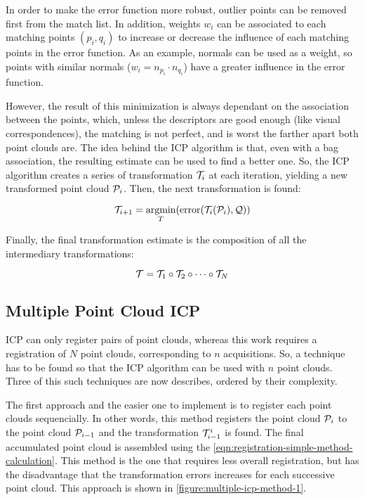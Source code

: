 In order to make the error function more robust, outlier points can be removed first from the match list. In addition, weights $w_i$ can be associated to each matching points $(p_i, q_i)$ to increase or decrease the influence of each matching points in the error function. As an example, normals can be used as a weight, so points with similar normals ($w_i = n_{p_i} \cdot n_{q_i}$) have a greater influence in the error function. 

However, the result of this minimization is always dependant on the association between the points, which, unless the descriptors are good enough (like visual correspondences), the matching is not perfect, and is worst the farther apart both point clouds are. The idea behind the ICP algorithm is that, even with a bag association, the resulting estimate can be used to find a better one. So, the ICP algorithm creates a series of transformation $\mathcal{T}_i$ at each iteration, yielding a new transformed point cloud $\mathcal{P}_i$. Then, the next transformation is found:

\begin{equation}
    \mathcal{T}_{i+1} = \underset{T}{\textrm{argmin}}(\textrm{error}(\mathcal{T}_i(\mathcal{P}_i), \mathcal{Q}))
\end{equation}

Finally, the final transformation estimate is the composition of all the intermediary transformations:

\begin{equation}
    \mathcal{T} = \mathcal{T}_1 \circ \mathcal{T}_2 \circ \dots \circ \mathcal{T}_N
\end{equation}

\subsection{Multiple Point Cloud ICP}
\label{section:multiple-pointcloud-icp}

ICP can only register pairs of point clouds, whereas this work requires a registration of $N$ point clouds, corresponding to $n$ acquisitions. So, a technique has to be found so that the ICP algorithm can be used with $n$ point clouds. Three of this such techniques are now describes, ordered by their complexity.

The first approach and the easier one to implement is to register each point clouds sequencially. In other words, this method registers the point cloud $\mathcal{P}_i$ to the point cloud $\mathcal{P}_{i-1}$ and the transformation $\mathcal{T}_{i-1}^{i}$ is found. The final accumulated point cloud is assembled using the \cref{eqn:registration-simple-method-calculation}. This method is the one that requires less overall registration, but has the disadvantage that the transformation errors increases for each successive point cloud. This approach is shown in \cref{figure:multiple-icp-method-1}.

